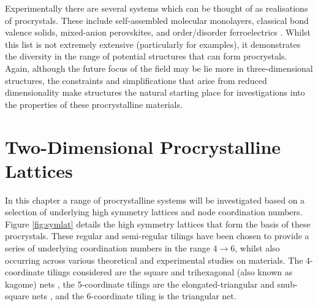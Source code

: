 Experimentally there are several systems which can be thought of as realisations of procrystals. 
These include self-assembled molecular monolayers, classical bond valence solids, mixed-anion perovskites, and order/disorder ferroelectrics \cite{Blunt2008,Anderson1973,Camp2012,Comes1968}.
Whilst this list is not extremely extensive (particularly for \td{} examples), it demonstrates the diversity in the range of potential structures that can form procrystals.
Again, although the future focus of the field may be lie more in three\--dimensional structures, the constraints and simplifications that arise from reduced dimensionality make \td{} structures the natural starting place for investigations into the properties of these procrystalline materials.

\section{Two\--Dimensional Procrystalline Lattices}

In this chapter a range of \td{} procrystalline systems will be investigated based on a selection of underlying high symmetry lattices and node coordination numbers.
Figure \ref{fig:symlat} details the high symmetry lattices that form the basis of these procrystals.
These regular and semi\--regular tilings have been chosen to provide a series of underlying coordination numbers in the range $4\rightarrow6$, whilst also occurring across various theoretical and experimental studies on \td{} materials.
The $4$\--coordinate tilings considered are the square and trihexagonal (also known as kagome) nets \cite{Algara-Siller2015,Zhu2017,Hibble2011,Zheng2014,Postulka2016,Chen2011},
the $5$\--coordinate tilings are the elongated\--triangular and snub\--square nets \cite{Griffith2018,Urgel2014,Kryuchkov2018,Song2015,Pineros2016}, and the $6$\--coordinate tiling is the triangular net. 

